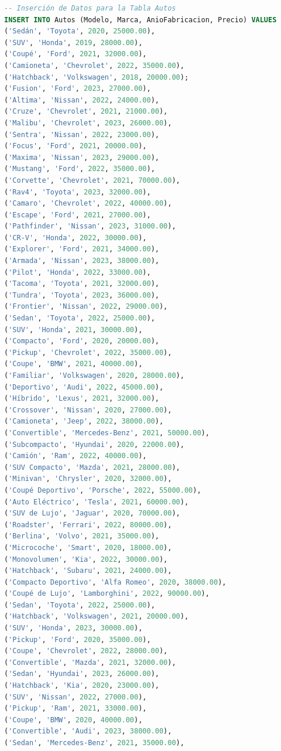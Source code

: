 \documentclass[12pt]{article}
\begin{document}
\begin{lstlisting}[language=SQL]
-- Inserción de Datos para la Tabla Autos
INSERT INTO Autos (Modelo, Marca, AnioFabricacion, Precio) VALUES
('Sedán', 'Toyota', 2020, 25000.00),
('SUV', 'Honda', 2019, 28000.00),
('Coupé', 'Ford', 2021, 32000.00),
('Camioneta', 'Chevrolet', 2022, 35000.00),
('Hatchback', 'Volkswagen', 2018, 20000.00);
('Fusion', 'Ford', 2023, 27000.00),
('Altima', 'Nissan', 2022, 24000.00),
('Cruze', 'Chevrolet', 2021, 21000.00),
('Malibu', 'Chevrolet', 2023, 26000.00),
('Sentra', 'Nissan', 2022, 23000.00),
('Focus', 'Ford', 2021, 20000.00),
('Maxima', 'Nissan', 2023, 29000.00),
('Mustang', 'Ford', 2022, 35000.00),
('Corvette', 'Chevrolet', 2021, 70000.00),
('Rav4', 'Toyota', 2023, 32000.00),
('Camaro', 'Chevrolet', 2022, 40000.00),
('Escape', 'Ford', 2021, 27000.00),
('Pathfinder', 'Nissan', 2023, 31000.00),
('CR-V', 'Honda', 2022, 30000.00),
('Explorer', 'Ford', 2021, 34000.00),
('Armada', 'Nissan', 2023, 38000.00),
('Pilot', 'Honda', 2022, 33000.00),
('Tacoma', 'Toyota', 2021, 32000.00),
('Tundra', 'Toyota', 2023, 36000.00),
('Frontier', 'Nissan', 2022, 29000.00),
('Sedan', 'Toyota', 2022, 25000.00),
('SUV', 'Honda', 2021, 30000.00),
('Compacto', 'Ford', 2020, 20000.00),
('Pickup', 'Chevrolet', 2022, 35000.00),
('Coupe', 'BMW', 2021, 40000.00),
('Familiar', 'Volkswagen', 2020, 28000.00),
('Deportivo', 'Audi', 2022, 45000.00),
('Híbrido', 'Lexus', 2021, 32000.00),
('Crossover', 'Nissan', 2020, 27000.00),
('Camioneta', 'Jeep', 2022, 38000.00),
('Convertible', 'Mercedes-Benz', 2021, 50000.00),
('Subcompacto', 'Hyundai', 2020, 22000.00),
('Camión', 'Ram', 2022, 40000.00),
('SUV Compacto', 'Mazda', 2021, 28000.00),
('Minivan', 'Chrysler', 2020, 32000.00),
('Coupé Deportivo', 'Porsche', 2022, 55000.00),
('Auto Eléctrico', 'Tesla', 2021, 60000.00),
('SUV de Lujo', 'Jaguar', 2020, 70000.00),
('Roadster', 'Ferrari', 2022, 80000.00),
('Berlina', 'Volvo', 2021, 35000.00),
('Microcoche', 'Smart', 2020, 18000.00),
('Monovolumen', 'Kia', 2022, 30000.00),
('Hatchback', 'Subaru', 2021, 24000.00),
('Compacto Deportivo', 'Alfa Romeo', 2020, 38000.00),
('Coupé de Lujo', 'Lamborghini', 2022, 90000.00),
('Sedan', 'Toyota', 2022, 25000.00),
('Hatchback', 'Volkswagen', 2021, 20000.00),
('SUV', 'Honda', 2023, 30000.00),
('Pickup', 'Ford', 2020, 35000.00),
('Coupe', 'Chevrolet', 2022, 28000.00),
('Convertible', 'Mazda', 2021, 32000.00),
('Sedan', 'Hyundai', 2023, 26000.00),
('Hatchback', 'Kia', 2020, 23000.00),
('SUV', 'Nissan', 2022, 27000.00),
('Pickup', 'Ram', 2021, 33000.00),
('Coupe', 'BMW', 2020, 40000.00),
('Convertible', 'Audi', 2023, 38000.00),
('Sedan', 'Mercedes-Benz', 2021, 35000.00),

\end{lstlisting}
\end{document}
